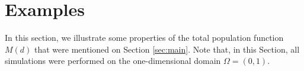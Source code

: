 \documentclass[11pt]{article}
\newcommand{\parentheses}[1]{\left(#1\right)}
\theoremstyle{definition}
\theoremstyle{remark}
\newtheorem{example}[statement]{Example}
\begin{document}
\section{Examples}
\label{sec:examples}

In this section, we illustrate some properties of the total population function $M(d)$ that were mentioned on Section \ref{sec:main}. Note that, in this Section, all simulations were performed on the one-dimensional domain $\Omega=(0,1)$.


    
       
    

\end{document}

